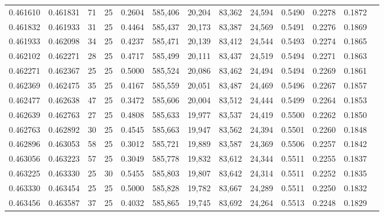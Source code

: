 \begin{tabular}{rrrrrrrrrrrrr}
0.461610 & 0.461831 &    71 &  25 &                                     0.2604 & 585,406 &  20,204 &  83,362 &  24,594 & 0.5490 & 0.2278 & 0.1872 \\
0.461832 & 0.461933 &    31 &  25 &                                     0.4464 & 585,437 &  20,173 &  83,387 &  24,569 & 0.5491 & 0.2276 & 0.1869 \\
0.461933 & 0.462098 &    34 &  25 &                                     0.4237 & 585,471 &  20,139 &  83,412 &  24,544 & 0.5493 & 0.2274 & 0.1865 \\
0.462102 & 0.462271 &    28 &  25 &                                     0.4717 & 585,499 &  20,111 &  83,437 &  24,519 & 0.5494 & 0.2271 & 0.1863 \\
0.462271 & 0.462367 &    25 &  25 &                                     0.5000 & 585,524 &  20,086 &  83,462 &  24,494 & 0.5494 & 0.2269 & 0.1861 \\
0.462369 & 0.462475 &    35 &  25 &                                     0.4167 & 585,559 &  20,051 &  83,487 &  24,469 & 0.5496 & 0.2267 & 0.1857 \\
0.462477 & 0.462638 &    47 &  25 &                                     0.3472 & 585,606 &  20,004 &  83,512 &  24,444 & 0.5499 & 0.2264 & 0.1853 \\
0.462639 & 0.462763 &    27 &  25 &                                     0.4808 & 585,633 &  19,977 &  83,537 &  24,419 & 0.5500 & 0.2262 & 0.1850 \\
0.462763 & 0.462892 &    30 &  25 &                                     0.4545 & 585,663 &  19,947 &  83,562 &  24,394 & 0.5501 & 0.2260 & 0.1848 \\
0.462896 & 0.463053 &    58 &  25 &                                     0.3012 & 585,721 &  19,889 &  83,587 &  24,369 & 0.5506 & 0.2257 & 0.1842 \\
0.463056 & 0.463223 &    57 &  25 &                                     0.3049 & 585,778 &  19,832 &  83,612 &  24,344 & 0.5511 & 0.2255 & 0.1837 \\
0.463225 & 0.463330 &    25 &  30 &                                     0.5455 & 585,803 &  19,807 &  83,642 &  24,314 & 0.5511 & 0.2252 & 0.1835 \\
0.463330 & 0.463454 &    25 &  25 &                                     0.5000 & 585,828 &  19,782 &  83,667 &  24,289 & 0.5511 & 0.2250 & 0.1832 \\
0.463456 & 0.463587 &    37 &  25 &                                     0.4032 & 585,865 &  19,745 &  83,692 &  24,264 & 0.5513 & 0.2248 & 0.1829 \\

\end{tabular}
